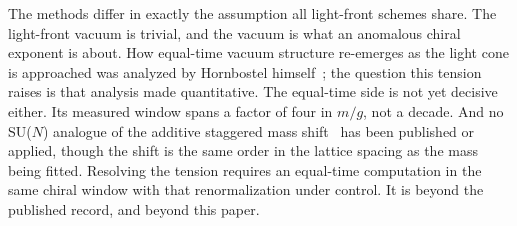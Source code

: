 The methods differ in exactly the assumption all light-front schemes share.
The light-front vacuum is trivial, and the vacuum is what an anomalous
chiral exponent is about.  How equal-time vacuum structure re-emerges as
the light cone is approached was analyzed by Hornbostel
himself~\cite{Hornbostel:1991qj}; the question this tension raises is that
analysis made quantitative.  The equal-time side is not yet decisive either.
Its measured window spans a factor of four in $m/g$, not a decade.  And no
SU($N$) analogue of the additive staggered mass
shift~\cite{Dempsey:2022nys} has been published or applied, though the
shift is the same order in the lattice spacing as the mass being fitted.
Resolving the tension requires an equal-time computation in the same chiral
window with that renormalization under control.  It is beyond the published
record, and beyond this paper.
